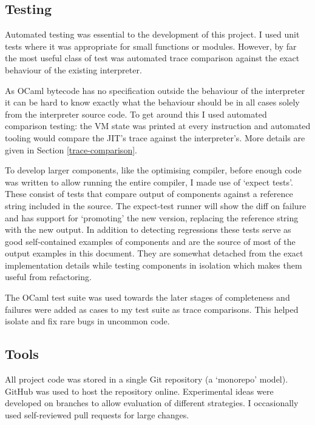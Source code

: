 \subsection{Testing}

Automated testing was essential to the development of this project. I used unit tests where it was
appropriate for small functions or modules. However, by far the most useful class of test was
automated trace comparison against the exact behaviour of the existing interpreter.

As OCaml bytecode has no specification outside the behaviour of the interpreter it can be hard
to know exactly what the behaviour should be in all cases solely from the interpreter source code.
To get around this I used automated comparison testing: the VM state was printed at every
instruction and automated
tooling would compare the JIT's trace against the interpreter's. More details are given in
Section \ref{trace-comparison}.

To develop larger components, like the optimising compiler, before enough code was written to allow
running the entire compiler, I made use of `expect tests'. These consist of tests that compare
output of components against a reference string included in the source. The expect-test runner will
show the diff on failure and has support for `promoting' the new version, replacing the reference
string with the new output. In addition to detecting regressions these tests serve as good
self-contained examples of components and are the source of most of the output examples in this
document. They are somewhat detached from the exact implementation details while testing components
in isolation which makes them useful from refactoring.

The OCaml test suite was used towards the later stages of completeness and failures were added as
cases to my test suite as trace comparisons. This helped isolate and fix rare bugs in uncommon
code.


\subsection{Tools}

All project code was stored in a single Git repository (a `monorepo' model). GitHub was used to
host the repository online. Experimental ideas were developed on
branches to allow evaluation of different
strategies. I occasionally used self-reviewed pull requests for large changes.

